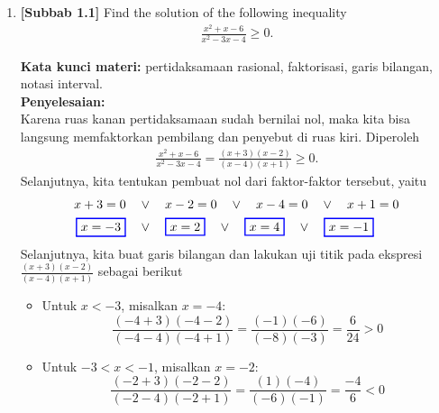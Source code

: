 \documentclass[10pt,openany,a4paper]{article}
\theoremstyle{definition}
\theoremstyle{definition}
\theoremstyle{plain}
\newenvironment{jawab}[2][tes]{%
\par\noindent\textbf{Kata kunci materi:} #1.\\
\textbf{Penyelesaian:} #2%
}{}
\begin{document}
\newpage

\begin{enumerate}
    \item \textbf{[Subbab 1.1]} Find the solution of the following inequality
    \begin{align*}
        \frac{x^2+x-6}{x^2-3x-4}\geq 0.
    \end{align*}
    \begin{jawab}[pertidaksamaan rasional, faktorisasi, garis bilangan, notasi interval]{~\\
    Karena ruas kanan pertidaksamaan sudah bernilai nol, maka kita bisa langsung memfaktorkan pembilang dan penyebut di ruas kiri. Diperoleh
    \begin{align*}
        \frac{x^2+x-6}{x^2-3x-4} = \frac{(x+3)(x-2)}{(x-4)(x+1)} \geq 0.
    \end{align*}
    Selanjutnya, kita tentukan pembuat nol dari faktor-faktor tersebut, yaitu
    \begin{align*}
        x+3 = 0 \quad &\vee\quad x-2 = 0 \quad \vee\quad x-4 = 0 \quad \vee\quad x+1 = 0\\
        \colorlet{oldcolor}{.}
        \color{blue}
        \setlength{\fboxrule}{1pt} \boxed{\color{oldcolor}x=-3}\color{oldcolor} \quad &\vee\quad \colorlet{oldcolor}{.}
        \color{blue}
        \setlength{\fboxrule}{1pt} \boxed{\color{oldcolor}x=2}\color{oldcolor} \quad \vee\quad \colorlet{oldcolor}{.}
        \color{blue}
        \setlength{\fboxrule}{1pt} \boxed{\color{oldcolor}x=4}\color{oldcolor} \quad \vee\quad \colorlet{oldcolor}{.}
        \color{blue}
        \setlength{\fboxrule}{1pt} \boxed{\color{oldcolor}x=-1}\color{oldcolor}
    \end{align*}
    Selanjutnya, kita buat garis bilangan dan lakukan uji titik pada ekspresi \(\frac{(x+3)(x-2)}{(x-4)(x+1)}\) sebagai berikut
    \begin{itemize}
        \item Untuk \(x < -3\), misalkan \(x = -4\):
        \[
        \frac{(-4+3)(-4-2)}{(-4-4)(-4+1)} = \frac{(-1)(-6)}{(-8)(-3)} = \frac{6}{24} > 0
        \]
        \item Untuk \(-3 < x < -1\), misalkan \(x = -2\):
        \[
        \frac{(-2+3)(-2-2)}{(-2-4)(-2+1)} = \frac{(1)(-4)}{(-6)(-1)} = \frac{-4}{6} < 0
\]
\end{itemize}}
\end{jawab}
\end{enumerate}
\end{document}
